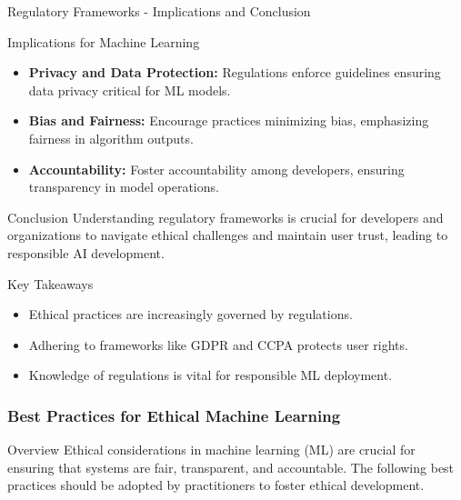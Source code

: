 \documentclass[aspectratio=169]{beamer}
\begin{document}
\begin{frame}[fragile]{Regulatory Frameworks - Implications and Conclusion}
    \begin{block}{Implications for Machine Learning}
        \begin{itemize}
            \item \textbf{Privacy and Data Protection:} Regulations enforce guidelines ensuring data privacy critical for ML models.
            \item \textbf{Bias and Fairness:} Encourage practices minimizing bias, emphasizing fairness in algorithm outputs.
            \item \textbf{Accountability:} Foster accountability among developers, ensuring transparency in model operations.
        \end{itemize}
    \end{block}
    
    \begin{block}{Conclusion}
        Understanding regulatory frameworks is crucial for developers and organizations to navigate ethical challenges and maintain user trust, leading to responsible AI development.
    \end{block}
    
    \begin{block}{Key Takeaways}
        \begin{itemize}
            \item Ethical practices are increasingly governed by regulations.
            \item Adhering to frameworks like GDPR and CCPA protects user rights.
            \item Knowledge of regulations is vital for responsible ML deployment.
        \end{itemize}
    \end{block}
\end{frame}

\begin{frame}[fragile]
    \frametitle{Best Practices for Ethical Machine Learning}
    \begin{block}{Overview}
        Ethical considerations in machine learning (ML) are crucial for ensuring that systems are fair, transparent, and accountable. The following best practices should be adopted by practitioners to foster ethical development.
    \end{block}
\end{frame}
\end{document}
